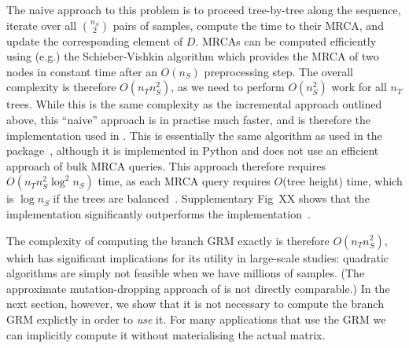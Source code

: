 The naive approach to this problem 
is to proceed tree-by-tree along the sequence,
iterate over all $\binom{n_S}{2}$ pairs of samples, compute the 
time to their MRCA, and update the corresponding element of $D$.
MRCAs can be computed efficiently using (e.g.) the Schieber-Vishkin
algorithm \citep{Schieber1988On,knuth2011combinatorial}
which provides the MRCA of two nodes in constant time
after an $O(n_S)$ preprocessing step.
The overall complexity is therefore $O(n_T n_S^2)$,
as we need to perform $O(n_S^2)$ work for all $n_T$ trees.
While this is the same complexity as the incremental approach outlined
above, this ``naive'' approach is in practise much faster, and 
is therefore the implementation used in \tskit{}.
This is essentially the same algorithm as used in the 
\eGRM{} package~\citet{fan2022genealogical}, although it is implemented in
Python and does not use an efficient approach of bulk MRCA queries. 
This approach therefore requires $O(n_T n_S^2 \log^2{n_S})$ time, 
as each MRCA query requires $O$(tree height) time, which is $\log n_S$
if the trees are balanced~\citep{kelleher2016efficient}.
Supplementary Fig~XX shows that the \tskit{} implementation 
significantly outperforms the \eGRM{}
implementation~\citep{fan2022genealogical}.

The complexity of computing the branch GRM exactly is therefore $O(n_T n_S^2)$,
which has significant implications for its utility in large-scale studies:
quadratic algorithms are simply not feasible when we have millions 
of samples. 
(The approximate  mutation-dropping approach of \citet{zhang2023biobank}
is not directly comparable.)
In the next section, however, we show that it is not necessary
to compute the branch GRM explictly in order to \emph{use} it. For many 
applications that use the GRM we can implicitly compute it without 
materialising the actual matrix.




